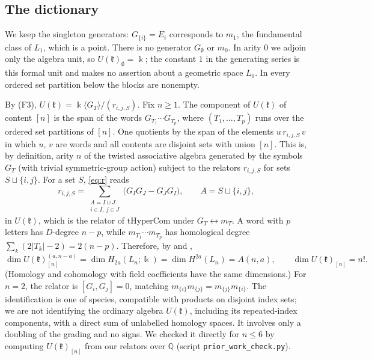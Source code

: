 \documentclass[11pt]{amsart}
\theoremstyle{definition}
\theoremstyle{remark}
\newcommand{\Q}{\mathbb{Q}}
\newcommand{\kk}{\Bbbk}
\newcommand{\kr}{\mathfrak{k}}
\begin{document}
\subsection*{The dictionary}
We keep the singleton generators: $G_{\{i\}}=E_i$ corresponds to $m_1$, the fundamental class of $L_1$, which is a point. There is no generator $G_\emptyset$ or $m_0$. In arity $0$ we adjoin only the algebra unit, so $U(\kr)_\emptyset=\kk$; the constant $1$ in the generating series is this formal unit and makes no assertion about a geometric space $L_0$. In every ordered set partition below the blocks are nonempty.

By (F3), $U(\kr)=\kk\langle G_T\rangle/(r_{i,j,S})$. Fix $n\ge1$. The component of $U(\kr)$ of content $[n]$ is the span of the words $G_{T_1}\cdots G_{T_p}$, where $(T_1,\dots,T_p)$ runs over the ordered set partitions of $[n]$. One quotients by the span of the elements $u\,r_{i,j,S}\,v$ in which $u$, $v$ are words and all contents are disjoint sets with union $[n]$. This is, by definition, arity $n$ of the twisted associative algebra generated by the symbols $G_T$ (with trivial symmetric-group action) subject to the relators $r_{i,j,S}$ for sets $S\sqcup\{i,j\}$. For a set $S$, \eqref{eq:r} reads
\[
r_{i,j,S}=\sum_{\substack{A=I\sqcup J\\ i\in I,\ j\in J}}\big(G_IG_J-G_JG_I\big),\qquad A=S\sqcup\{i,j\},
\]
in $U(\kr)$, which is the relator of $\mathrm{tHyperCom}$ under $G_T\leftrightarrow m_T$. A word with $p$ letters has $D$-degree $n-p$, while $m_{T_1}\cdots m_{T_p}$ has homological degree $\sum_k(2|T_k|-2)=2(n-p)$. Therefore, by \cite[Prop.~2.4.2]{DST} and \cite[Thm.~2.3]{LM},
\begin{equation}\label{eq:LMdims}
\dim U(\kr)_{[n]}^{(a,n-a)}=\dim H_{2a}(L_n;\kk)=\dim H^{2a}(L_n)=A(n,a),\qquad \dim U(\kr)_{[n]}=n!.
\end{equation}
(Homology and cohomology with field coefficients have the same dimensions.) For $n=2$, the relator is $[G_i,G_j]=0$, matching $m_{\{i\}}m_{\{j\}}=m_{\{j\}}m_{\{i\}}$. The identification is one of species, compatible with products on disjoint index sets; we are not identifying the ordinary algebra $U(\kr)$, including its repeated-index components, with a direct sum of unlabelled homology spaces. It involves only a doubling of the grading and no signs. We checked it directly for $n\le6$ by computing $U(\kr)_{[n]}$ from our relators over $\Q$ (script \texttt{prior\_work\_check.py}).
\end{document}
